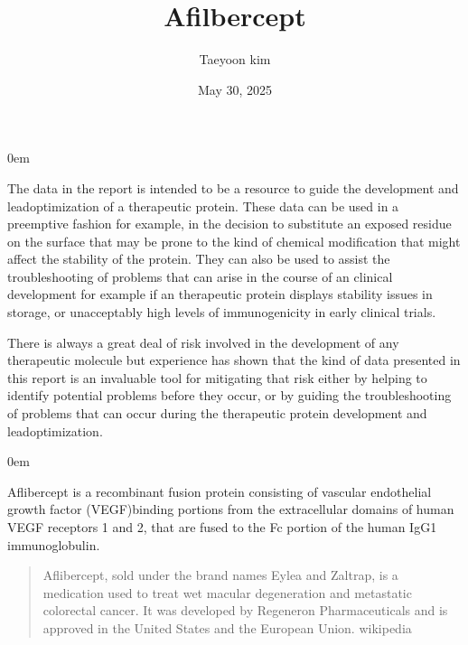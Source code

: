 \documentclass[letterpaper,10pt,english]{jupyterBook}
\title{Afilbercept}
\date{May 30, 2025}
\author{Taeyoon kim}
\begin{document}
\pagestyle{empty}
\sphinxmaketitle
\pagestyle{plain}
\sphinxtableofcontents
\pagestyle{normal}
\label{\detokenize{intro::doc}}


\begin{DUlineblock}{0em}
\item[] 
\end{DUlineblock}

\sphinxAtStartPar
The data in the report is intended to be a resource to guide the development and lead\sphinxhyphen{}optimization of a therapeutic protein. These data can be used in a preemptive fashion \sphinxhyphen{} for example, in the decision to substitute an exposed residue on the surface that may be prone to the kind of chemical modification that might affect the stability of the protein. They can also be used to assist the troubleshooting of problems that can arise in the course of an clinical development \sphinxhyphen{} for example if an therapeutic protein displays stability issues in storage, or unacceptably high levels of immunogenicity in early clinical trials.

\sphinxAtStartPar
There is always a great deal of risk involved in the development of any therapeutic molecule but experience has shown that the kind of data presented in this report is an invaluable tool for mitigating that risk \sphinxhyphen{} either by helping to identify potential problems before they occur, or by guiding the troubleshooting of problems that can occur during the therapeutic protein development and lead\sphinxhyphen{}optimization.

\begin{DUlineblock}{0em}
\item[] 
\end{DUlineblock}

\sphinxAtStartPar
Aflibercept is a recombinant fusion protein consisting of vascular endothelial growth factor (VEGF)\sphinxhyphen{}binding portions from the extracellular domains of human VEGF receptors 1 and 2, that are fused to the Fc portion of the human IgG1 immunoglobulin.
\begin{quote}

\sphinxAtStartPar
Aflibercept, sold under the brand names Eylea and Zaltrap, is a medication used to treat wet macular degeneration and metastatic colorectal cancer. It was developed by Regeneron Pharmaceuticals and is approved in the United States and the European Union. \sphinxhyphen{} wikipedia
\end{quote}
\end{document}
